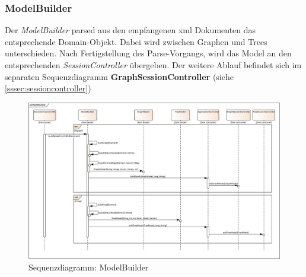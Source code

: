 \documentclass[11pt,a4paper,english,oneside]{book}
\numberwithin{equation}{chapter}
\begin{document}
	\subsubsection{ModelBuilder} 	\label{sssec:modelbuilder}
	Der \textit{ModelBuilder} parsed aus den empfangenen \gls{xml} Dokumenten das entsprechende Domain-Objekt. Dabei wird zwischen Graphen und Trees unterschieden. Nach Fertigstellung des Parse-Vorgangs, wird das Model an den entsprechenden \textit{SessionController} übergeben. Der weitere Ablauf befindet sich im separaten Sequenzdiagramm \textbf{GraphSessionController} (siehe \ref{sssec:sessioncontroller})
	\begin{figure}[h!]
		\centering
		\includegraphics[width=\linewidth]{assets/images/modelbuilder}
		\caption{Sequenzdiagramm: ModelBuilder}
		\label{fig:sd-modelbuilder}
	\end{figure}
\end{document}
